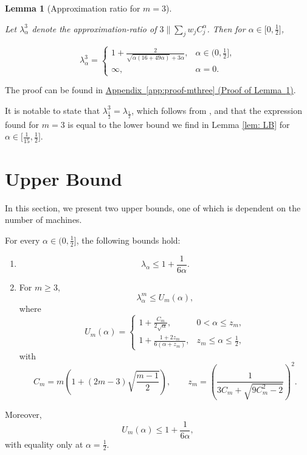 \documentclass[%
english, titlepage=false %
]{./tum-templates/book/tumbook}
\newtheorem{lemma}{Lemma}
\begin{document}
\begin{lemma}[Approximation ratio for $m=3$]\label{lem: mthree}

    Let $\lambda^{3}_{\alpha}$ denote the approximation-ratio of $3\!\parallel\!\sum_{j} w_j C^{\alpha}_j$. Then for 
    $\alpha \in \Big[0,\frac12\Big]$,

   \[
\lambda^3_{\alpha}
=
\begin{cases}
1+
\frac{2}{\sqrt{\alpha(16+49\alpha)}+3\alpha}, & \alpha\in \Big(0,\frac12\Big],\\[1.2ex]
\infty,
& \alpha=0.
\end{cases}
\]
\end{lemma}

The proof can be found in \hyperlink{proof:mthree}{Appendix~\ref*{app:proof-mthree}
(Proof of Lemma~\ref*{lem: mthree})}.\medskip

\noindent
It is notable to state that $\lambda^3_{\frac12} = \lambda_{\frac12}$, which follows from , and that the expression 
found for $m=3$ is equal to the lower bound we find in Lemma \ref{lem: LB} for $\alpha \in \Big[\frac{1}{15}, \frac12\Big]$.


\newpage

\section{Upper Bound}\label{sec:Upper Bound}

In this section, we present two upper bounds, one of which is dependent on the number of machines.
\begin{framed}
For every \(\alpha\in \Big(0,\frac12\Big]\), the following bounds hold:

\begin{enumerate}[label=(\roman*)]
    \item
    \[
        \lambda_\alpha
        \leq
        1+\frac{1}{6\alpha}.
    \]

    \item For \(m\geq3\),
    \[
        \lambda_\alpha^m\leq U_m(\alpha),
    \]
    where
    \[
        U_m(\alpha)=
        \begin{cases}
            \displaystyle
            1+\frac{C_m}{2\sqrt{\alpha}},
            & 0<\alpha\leq z_m,\\[2.5mm]
            \displaystyle
            1+\frac{1+2z_m}{6(\alpha+z_m)},
            & z_m\leq\alpha\leq\frac12,
        \end{cases}
    \]
    with
    \[
        C_m
        =
        m\left(
            1+(2m-3)\sqrt{\frac{m-1}{2}}
        \right),
        \qquad
        z_m
        =
        \left(
            \frac{1}
            {3C_m+\sqrt{9C_m^2-2}}
        \right)^2.
    \]
\end{enumerate}

Moreover,
\[
    U_m(\alpha)
    \leq
    1+\frac{1}{6\alpha},
\]
with equality only at \(\alpha=\frac12\).
\end{framed}
\end{document}

